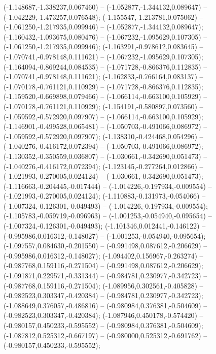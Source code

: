  (-1.148687,-1.338237,0.067460) -- (-1.052877,-1.344132,0.089647) -- (-1.042229,-1.473257,0.076548);
 (-1.155547,-1.213781,0.075062) -- (-1.061250,-1.217935,0.099946) -- (-1.052877,-1.344132,0.089647);
 (-1.160432,-1.093675,0.080476) -- (-1.067232,-1.095629,0.107305) -- (-1.061250,-1.217935,0.099946);
 (-1.163291,-0.978612,0.083645) -- (-1.070741,-0.978148,0.111621) -- (-1.067232,-1.095629,0.107305);
 (-1.164094,-0.869244,0.084535) -- (-1.071728,-0.866376,0.112835) -- (-1.070741,-0.978148,0.111621);
 (-1.162833,-0.766164,0.083137) -- (-1.070178,-0.761121,0.110929) -- (-1.071728,-0.866376,0.112835);
 (-1.159520,-0.669898,0.079466) -- (-1.066114,-0.663100,0.105929) -- (-1.070178,-0.761121,0.110929);
 (-1.154191,-0.580897,0.073560) -- (-1.059592,-0.572920,0.097907) -- (-1.066114,-0.663100,0.105929);
 (-1.146901,-0.499528,0.065481) -- (-1.050703,-0.491066,0.086972) -- (-1.059592,-0.572920,0.097907);
 (-1.138310,-0.424468,0.054296) -- (-1.040276,-0.416172,0.072394) -- (-1.050703,-0.491066,0.086972);
 (-1.130352,-0.350559,0.036807) -- (-1.030661,-0.342690,0.051473) -- (-1.040276,-0.416172,0.072394);
 (-1.123145,-0.277264,0.012866) -- (-1.021993,-0.270005,0.024124) -- (-1.030661,-0.342690,0.051473);
 (-1.116663,-0.204445,-0.017444) -- (-1.014226,-0.197934,-0.009554) -- (-1.021993,-0.270005,0.024124);
 (-1.110883,-0.131973,-0.054066) -- (-1.007324,-0.126301,-0.049493) -- (-1.014226,-0.197934,-0.009554);
 (-1.105783,-0.059719,-0.096963) -- (-1.001253,-0.054940,-0.095654) -- (-1.007324,-0.126301,-0.049493);
 (-1.101346,0.012441,-0.146122) -- (-0.995986,0.016312,-0.148027) -- (-1.001253,-0.054940,-0.095654);
 (-1.097557,0.084630,-0.201550) -- (-0.991498,0.087612,-0.206629) -- (-0.995986,0.016312,-0.148027);
 (-1.094402,0.156967,-0.263274) -- (-0.987768,0.159116,-0.271504) -- (-0.991498,0.087612,-0.206629);
 (-1.091871,0.229571,-0.331344) -- (-0.984781,0.230977,-0.342723) -- (-0.987768,0.159116,-0.271504);
 (-1.089956,0.302561,-0.405828) -- (-0.982523,0.303347,-0.420384) -- (-0.984781,0.230977,-0.342723);
 (-1.088649,0.376057,-0.486816) -- (-0.980984,0.376381,-0.504609) -- (-0.982523,0.303347,-0.420384);
 (-1.087946,0.450178,-0.574420) -- (-0.980157,0.450233,-0.595552) -- (-0.980984,0.376381,-0.504609);
 (-1.087812,0.525312,-0.667197) -- (-0.980000,0.525312,-0.691762) -- (-0.980157,0.450233,-0.595552);
